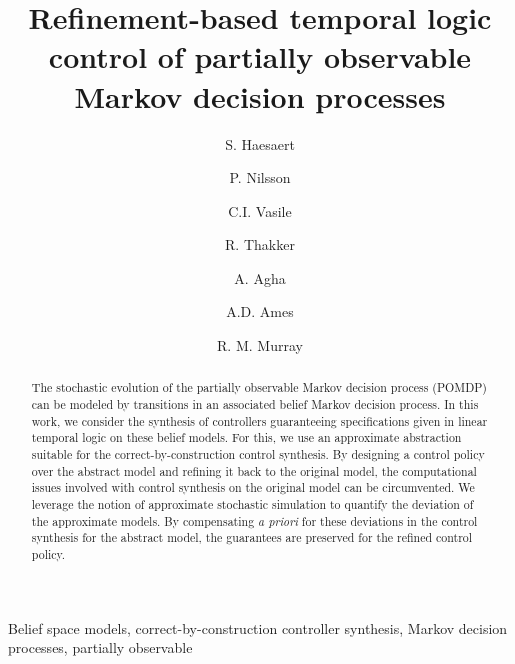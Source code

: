 \documentclass{ifacconf}
\begin{document}
\begin{frontmatter}

\title{\huge Refinement-based temporal logic control of partially observable Markov decision processes }

\author[cal]{S. Haesaert} 
\author[cal]{P. Nilsson} 
\author[mit]{C.I. Vasile}
\author[jpl]{R. Thakker}
\author[jpl]{A. Agha}
\author[cal]{A.D.  Ames}
\author[cal]{R. M. Murray}


\address[cal]{California Institute of Technology, 
   Pasadena, CA 91125 USA} %
\address[mit]{Massachusetts Institute of Technology, 
   Cambridge, MA 02139 USA}%
\address[jpl]{Jet Propulsion Laboratory, 
   Pasadena, CA 91109 USA}%
\maketitle
\begin{abstract}
The stochastic evolution of the partially observable Markov decision process (POMDP) can be modeled by transitions in an associated belief Markov decision process.
In this work, we consider the synthesis of controllers guaranteeing  specifications given in linear temporal logic on these belief models.
For this, we use an approximate  abstraction %
 suitable for the correct-by-construction control synthesis. By designing a control policy over the abstract model and refining it back to the original model, the computational issues involved with control synthesis on the original model can be circumvented. 
We leverage the notion of approximate stochastic simulation to quantify the deviation of the approximate models.  %
By compensating {\it a priori} for these deviations in the control synthesis for the abstract model, the guarantees are preserved for the refined control policy.
\end{abstract}
\begin{keyword} Belief space models,
correct-by-construction controller synthesis, Markov decision processes, partially observable
\end{keyword}

\end{frontmatter}
 
\end{document}

